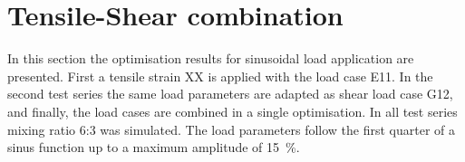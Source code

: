 



\section{Tensile-Shear combination}
In this section the optimisation results for sinusoidal load application are presented. First a tensile strain  XX is applied with the load case E11. In the second test series the same load parameters are adapted as shear load case G12, and finally, the load cases are combined in a single optimisation. In all test series mixing ratio 6:3 was simulated. The load parameters follow the first quarter of a sinus function up to a maximum amplitude of 15 \%. 

